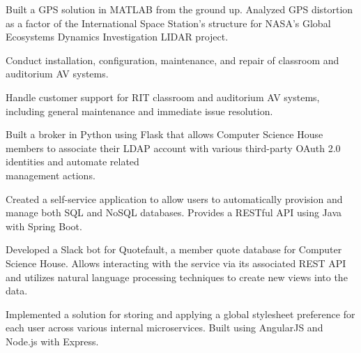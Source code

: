 \documentclass[9pt,letter]{altacv}
\begin{document}
\divider

Built a GPS solution in MATLAB from the ground up. Analyzed GPS distortion as a factor of the International Space Station's structure for NASA's Global Ecosystems Dynamics Investigation LIDAR project.


\divider

Conduct installation, configuration, maintenance, and repair of classroom and auditorium AV systems.

Handle customer support for RIT classroom and auditorium AV systems, including general maintenance and immediate issue resolution.



Built a broker in Python using Flask that allows Computer Science House members to associate their LDAP account with various third-party OAuth 2.0 identities and automate related\\ management actions.

\divider

Created a self-service application to allow users to automatically provision and manage both SQL and NoSQL databases. Provides a RESTful API using Java with Spring Boot.

\divider

Developed a Slack bot for Quotefault, a member quote database for Computer Science House. Allows interacting with the service via its associated REST API and utilizes natural language processing techniques to create new views into the data.

\divider

Implemented a solution for storing and applying a global stylesheet preference for each user across various internal microservices. Built using AngularJS and Node.js with Express.

%

\clearpage
\end{document}
